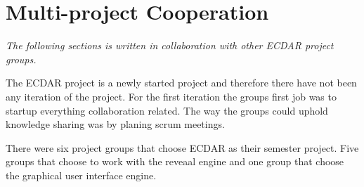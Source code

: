 \section{Multi-project Cooperation}\label{Scrum/multi-project-cooperation}
\textit{The following sections is written in collaboration with other ECDAR project groups.}

The ECDAR project is a newly started project and therefore there have not been any iteration of the project.
For the first iteration the groups first job was to startup everything collaboration related. 
The way the groups could uphold knowledge sharing was by planing scrum meetings.

There were six project groups that choose ECDAR as their semester project. 
Five groups that choose to work with the reveaal engine and one group that choose the graphical user interface engine.



